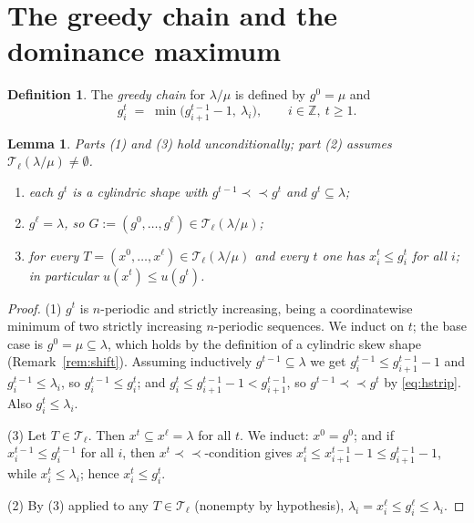 \documentclass[11pt]{article}
\theoremstyle{plain}
\newtheorem{lem}[thm]{Lemma}
\theoremstyle{definition}
\newtheorem{defn}[thm]{Definition}
\newcommand{\Z}{\mathbb{Z}}
\newcommand{\hstrip}{\prec\!\!\prec}
\begin{document}
\section{The greedy chain and the dominance maximum}\label{sec:greedy}

\begin{defn}\label{def:greedy}
The \emph{greedy chain} for $\lambda/\mu$ is defined by $g^{0}=\mu$ and
\begin{equation}\label{eq:greedy}
  g^{t}_i\;=\;\min\bigl(g^{t-1}_{i+1}-1,\ \lambda_i\bigr),\qquad i\in\Z,\ t\ge 1 .
\end{equation}
\end{defn}

\begin{lem}\label{lem:greedy}
Parts (1) and (3) hold unconditionally; part (2) assumes
$\mathcal{T}_\ell(\lambda/\mu)\neq\emptyset$.
\begin{enumerate}
\item each $g^{t}$ is a cylindric shape with $g^{t-1}\hstrip g^{t}$ and $g^{t}\subseteq\lambda$;
\item $g^{\ell}=\lambda$, so $G:=(g^0,\dots,g^{\ell})\in\mathcal{T}_\ell(\lambda/\mu)$;
\item for every $T=(x^0,\dots,x^\ell)\in\mathcal{T}_\ell(\lambda/\mu)$ and every $t$ one has
$x^{t}_i\le g^{t}_i$ for all $i$; in particular $u(x^t)\le u(g^t)$.
\end{enumerate}
\end{lem}

\begin{proof}
(1) $g^{t}$ is $n$-periodic and strictly increasing, being a coordinatewise minimum of two
strictly increasing $n$-periodic sequences. We induct on $t$; the base case is
$g^{0}=\mu\subseteq\lambda$, which holds by the definition of a cylindric skew shape
(Remark~\ref{rem:shift}). Assuming inductively $g^{t-1}\subseteq\lambda$ we
get $g^{t-1}_i\le g^{t-1}_{i+1}-1$ and $g^{t-1}_i\le\lambda_i$, so $g^{t-1}_i\le g^{t}_i$; and
$g^{t}_i\le g^{t-1}_{i+1}-1<g^{t-1}_{i+1}$, so $g^{t-1}\hstrip g^{t}$ by \eqref{eq:hstrip}.
Also $g^{t}_i\le\lambda_i$.

(3) Let $T\in\mathcal{T}_\ell$. Then $x^{t}\subseteq x^{\ell}=\lambda$ for all $t$. We induct:
$x^{0}=g^{0}$; and if $x^{t-1}_i\le g^{t-1}_i$ for all $i$, then $x^{t}\hstrip$-condition gives
$x^{t}_i\le x^{t-1}_{i+1}-1\le g^{t-1}_{i+1}-1$, while $x^{t}_i\le\lambda_i$; hence
$x^{t}_i\le g^{t}_i$.

(2) By (3) applied to any $T\in\mathcal{T}_\ell$ (nonempty by hypothesis),
$\lambda_i=x^{\ell}_i\le g^{\ell}_i\le\lambda_i$.
\end{proof}
\end{document}
